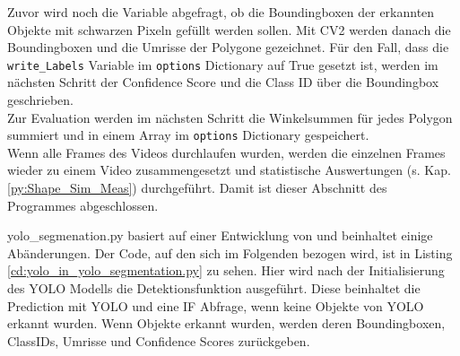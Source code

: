 {	Zuvor wird noch die Variable abgefragt, ob die Boundingboxen der erkannten Objekte mit schwarzen Pixeln gefüllt werden sollen. Mit CV2 werden danach die Boundingboxen und die Umrisse der Polygone gezeichnet. Für den Fall, dass die \lstinline|write_Labels| Variable im \lstinline|options| Dictionary auf True gesetzt ist, werden im nächsten Schritt der Confidence Score und die Class ID über die Boundingbox geschrieben. \\
	Zur Evaluation werden im nächsten Schritt die Winkelsummen für jedes Polygon summiert und in einem Array im \lstinline|options| Dictionary gespeichert. \\
	Wenn alle Frames des Videos durchlaufen wurden, werden die einzelnen Frames wieder zu einem Video zusammengesetzt und statistische Auswertungen (s. Kap. \ref{py:Shape_Sim_Meas}) durchgeführt. Damit ist dieser Abschnitt des Programmes abgeschlossen.\\
	\ifimportant
	
	\fi yolo\_segmenation.py basiert auf einer Entwicklung von \citeauthor{Canu_pysource} \citep{Canu_pysource} und beinhaltet einige Abänderungen. \ifimportant Der Code, auf den sich im Folgenden bezogen wird, ist in Listing \ref{cd:yolo_in_yolo_segmentation.py} zu sehen. \fi Hier wird nach der Initialisierung des YOLO Modells die Detektionsfunktion ausgeführt. Diese beinhaltet die Prediction mit YOLO und eine IF Abfrage, wenn keine Objekte von YOLO erkannt wurden. Wenn Objekte erkannt wurden, werden deren Boundingboxen, ClassIDs, Umrisse und Confidence Scores zurückgeben. 
	}

